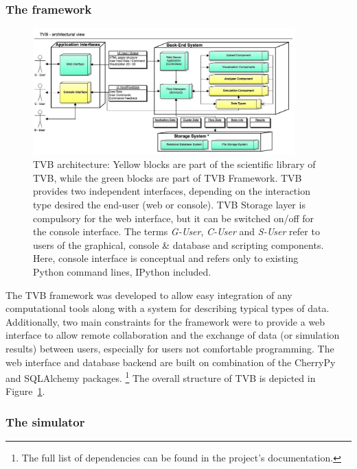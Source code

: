 \subsubsection{The framework}

 \begin{figure}
        \centering
        \includegraphics[width=0.90\textwidth]{images/architecture.jpg}
        \caption{TVB architecture: Yellow blocks are part of the scientific
            library of TVB, while the green blocks are part of TVB Framework.
            TVB provides two independent interfaces, depending on the
            interaction type desired the end-user (web or console).  TVB
            Storage layer is compulsory for the web interface, but it can be
	    switched on/off for the console interface.  The terms \textit{G-User},
	    \textit{C-User} and \textit{S-User} refer to users of the graphical,
	    console \& database and scripting components. Here, console interface
	    is conceptual and refers only to existing Python command lines, IPython
	    included. 
         }
        \label{fig:architecture}
 \end{figure}

The TVB framework was developed to allow easy integration of any
computational tools along with a system for describing typical types of data.
Additionally, 
two main constraints for the framework were to provide a web
interface to allow remote collaboration and the
exchange of data (or simulation results) between users, especially for
users not comfortable programming. The web interface
and database backend are built on combination of 
the \textsf{CherryPy} and \textsf{SQLAlchemy} packages.
\footnote{The full list of dependencies can be found in the
project's documentation.}
The overall structure of TVB is depicted in Figure~\ref{fig:architecture}.

\subsubsection{The simulator}

